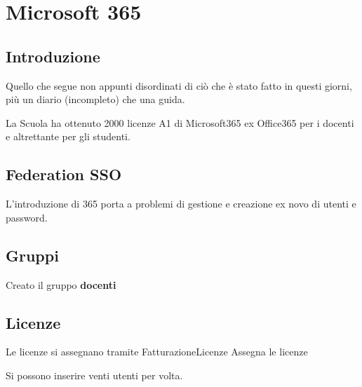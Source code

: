 \chapter{Microsoft 365}
\section{Introduzione}
Quello che segue non appunti disordinati di ciò che è stato fatto in questi giorni, più un diario (incompleto) che una guida.

La Scuola ha ottenuto 2000 licenze A1 di Microsoft365 ex Office365 per i docenti e altrettante per gli studenti.
\section{Federation SSO}
L'introduzione di 365 porta a problemi di gestione e creazione ex novo di utenti e password\cite{Google2023i}.
\section{Gruppi}
Creato il gruppo \textbf{docenti}
\section{Licenze}
Le licenze si assegnano tramite Fatturazione\textrightarrow Licenze \textrightarrow Assegna le licenze 

Si possono inserire venti utenti per volta. 